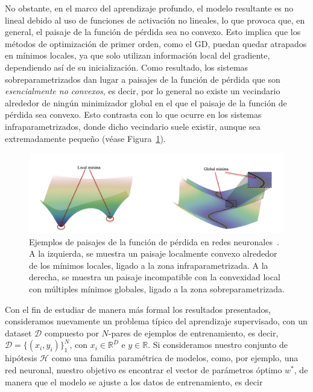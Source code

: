 No obstante, en el marco del aprendizaje profundo, el modelo resultante es no lineal debido al uso de funciones de activación no lineales, lo que provoca que, en general, el paisaje de la función de pérdida sea no convexo. Esto implica que los métodos de optimización de primer orden, como el GD, puedan quedar atrapados en mínimos locales, ya que solo utilizan información local del gradiente, dependiendo así de su inicialización. Como resultado, los sistemas sobreparametrizados dan lugar a paisajes de la función de pérdida que son \textit{esencialmente no convexos}, es decir, por lo general no existe un vecindario alrededor de ningún minimizador global en el que el paisaje de la función de pérdida sea convexo. Esto contrasta con lo que ocurre en los sistemas infraparametrizados, donde dicho vecindario suele existir, aunque sea extremadamente pequeño (véase Figura~\ref{fig:localglobalminima}).\newline

\begin{figure}[h]
    \centering
    \includegraphics[width=0.8\linewidth]{img/localglobalminima.png}
    \caption[Ejemplos de paisajes de la función de pérdida en redes neuronales~\cite{Liu2021}.]{Ejemplos de paisajes de la función de pérdida en redes neuronales~\cite{Liu2021}. A la izquierda, se muestra un paisaje localmente convexo alrededor de los mínimos locales, ligado a la zona infraparametrizada. A la derecha, se muestra un paisaje incompatible con la convexidad local con múltiples mínimos globales, ligado a la zona sobreparametrizada.}\label{fig:localglobalminima}
\end{figure}

Con el fin de estudiar de manera más formal los resultados presentados, consideramos nuevamente un problema típico del aprendizaje supervisado, con un dataset $\mathcal{D}$ compuesto por $N$-pares de ejemplos de entrenamiento, es decir,  $\mathcal{D} = \{(x_i, y_i)\}_{1}^{N}$, con $x_i \in \mathbb{R}^{D}$ e $y \in \mathbb{R}$. Si consideramos nuestro conjunto de hipótesis $\mathcal{H}$ como una familia paramétrica de modelos, como, por ejemplo, una red neuronal, nuestro objetivo es encontrar el vector de parámetros óptimo $w^{*}$, de manera que el modelo se ajuste a los datos de entrenamiento, es decir

